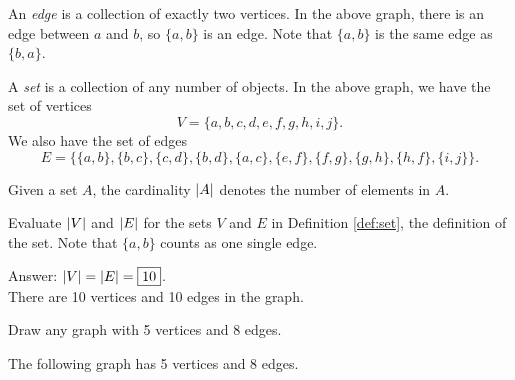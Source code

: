 \documentclass[11pt]{article}
\begin{document}
\begin{definition}
\label{def:edge}
An \textit{edge} is a collection of exactly two vertices. In the above graph, there is an edge
between $a$ and $b$, so $\{a, b\}$ is an edge. Note that $\{a,b\}$ is the same edge as $\{b,a\}$.
\end{definition}

\begin{definition}
\label{def:set}
A \textit{set} is a collection of any number of objects. In the above graph, we have the set of vertices
\[V=\{a, b, c, d, e, f, g, h, i, j\}.\]
We also have the set of edges
\[E=\{\{a,b\}, \{b,c\}, \{c,d\},\{b,d\},\{a,c\},\{e,f\},\{f,g\},\{g,h\},\{h,f\},\{i,j\} \}.\]
\end{definition}

\begin{definition}
\label{def:cardinality}
Given a set $A$, the cardinality $\left\lvert A \right\rvert$ denotes the number of elements in $A$.
\end{definition}

\begin{problem} %
Evaluate $\left\lvert V \right\rvert$ and $\left\lvert E \right\rvert$ for the sets $V$ and $E$ in Definition \ref{def:set}, the definition of the set.
Note that $\{a,b\}$ counts as one single edge.
\end{problem}

\begin{solution}
Answer: $\left\lvert V \right\rvert = \left\lvert E \right\rvert = \boxed{10}$. \\
There are 10 vertices and 10 edges in the graph.
\end{solution}

\begin{problem} %
Draw any graph with 5 vertices and 8 edges.
\end{problem}

\begin{solution}
The following graph has 5 vertices and 8 edges.
\begin{center}
\end{center}
\end{solution}
\end{document}
